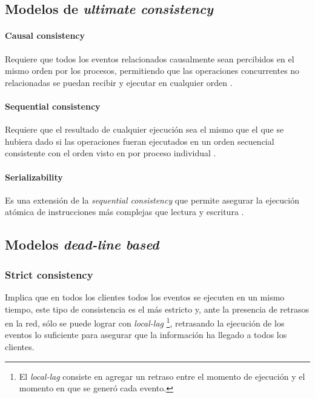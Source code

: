 \subsection{Modelos de \emph{ultimate consistency}}

\paragraph{Causal consistency} Requiere que todos los eventos relacionados causalmente sean percibidos en el mismo orden por los procesos, permitiendo que las operaciones concurrentes no relacionadas se puedan recibir y ejecutar en cualquier orden \cite{lamport1978time}.

\paragraph{Sequential consistency} Requiere que el resultado de cualquier ejecución sea el mismo que el que se hubiera dado si las operaciones fueran ejecutados en un orden secuencial consistente con el orden visto en por proceso individual \cite{lamport1979make}.

\paragraph{Serializability} Es una extensión de la \emph{sequential consistency} que permite asegurar la ejecución atómica de instrucciones más complejas que lectura y escritura \cite{bernstein1987rrency}.

\subsection{Modelos \emph{dead-line based}}

\subsubsection{Strict consistency}

Implica que en todos los clientes todos los eventos se ejecuten en un mismo tiempo, este tipo de consistencia es el más estricto y, ante la presencia de retrasos en la red, sólo se puede lograr con \emph{local-lag} \footnote{El \emph{local-lag} consiste en agregar un retraso entre el momento de ejecución y el momento en que se generó cada evento.}, retrasando la ejecución de los eventos lo suficiente para asegurar que la información ha llegado a todos los clientes.

